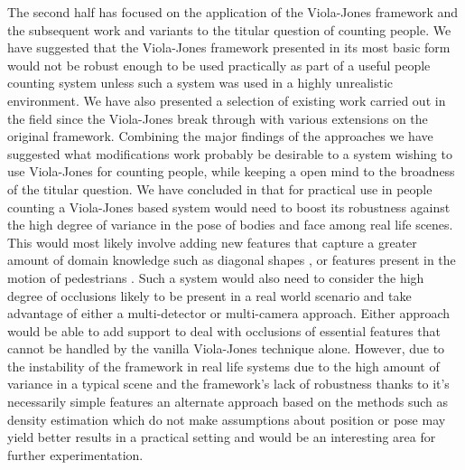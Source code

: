 \documentclass[conference]{IEEEtran}
\begin{document}
The second half has focused on the application of the Viola-Jones framework and the subsequent work and variants to the titular question of counting people. We have suggested that the Viola-Jones framework presented in its most basic form would not be robust enough to be used practically as part of a useful people counting system unless such a system was used in a highly unrealistic environment. We have also presented a selection of existing work carried out in the field since the Viola-Jones break through with various extensions on the original framework. Combining the major findings of the approaches we have suggested what modifications work probably be desirable to a system wishing to use Viola-Jones for counting people, while keeping a open mind to the broadness of the titular question. We have concluded in that for practical use in people counting a Viola-Jones based system would need to boost its robustness against the high degree of variance in the pose of bodies and face among real life scenes. This would most likely involve adding new features that capture a greater amount of domain knowledge such as diagonal shapes \cite{lienhart2002extended}, or features present in the motion of pedestrians \cite{viola2003detecting}. Such a system would also need to consider the high degree of occlusions likely to be present in a real world scenario and take advantage of either a multi-detector or multi-camera approach. Either approach would be able to add support to deal with occlusions of essential features that cannot be handled by the vanilla Viola-Jones technique alone. However, due to the instability of the framework in real life systems due to the high amount of variance in a typical scene and the framework's lack of robustness thanks to it's necessarily simple features an alternate approach based on the methods such as density estimation which do not make assumptions about position or pose may yield better results in a practical setting and would be an interesting area for further experimentation.
\end{document}
